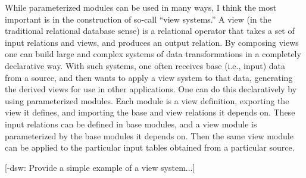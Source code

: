 While parameterized modules can be used in many ways, I think the most
important is in the construction of so-call ``view systems.''  A view
(in the traditional relational database sense) is a relational
operator that takes a set of input relations and views, and produces
an output relation.  By composing views one can build large and
complex systems of data transformations in a completely declarative
way.  With such systems, one often receives base (i.e., input) data
from a source, and then wants to apply a view system to that data,
generating the derived views for use in other applications.  One can
do this declaratively by using parameterized modules.  Each module is
a view definition, exporting the view it defines, and importing the
base and view relations it depends on.  These input relations can be
defined in base modules, and a view module is parameterized by the
base modules it depends on.  Then the same view module can be applied
to the particular input tables obtained from a particular source.

[-dsw: Provide a simple example of a view system...]



